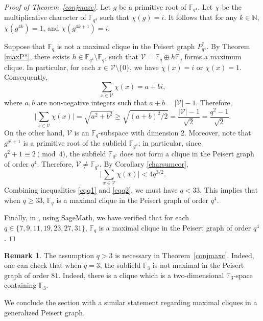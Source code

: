 \documentclass[12pt,reqno]{amsart}
\theoremstyle{definition}
\newtheorem{rem}[thm]{Remark}
\newcommand{\N}{\mathbb{N}}
\newcommand{\F}{\mathbb{F}}
\begin{document}
\begin{proof}[Proof of Theorem~\ref{conjmaxc}]
Let $g$ be a primitive root of $\F_{q^4}$. Let $\chi$ be the multiplicative character of $\F_{q^4}$ such that $\chi(g)=i$. It follows that for any $k \in \N$, $\chi(g^{4k})=1$, and $\chi(g^{4k+1})=i$. 

Suppose that $\F_{q}$ is not a maximal clique in the Peisert graph $P^*_{q^4}$. By Theorem \ref{maxP*}, there exists $h \in \F_{q^4} \setminus \F_{q}$, such that $\mathcal{V}=\F_{q} \oplus h\F_{q}$ forms a maximum clique. In particular, for each $x \in \mathcal{V}\setminus \{0\}$, we have $\chi(x)=i$ or $\chi(x)=1$.
Consequently,
\[
\sum_{x \in \mathcal{V}} \chi(x)=a+bi,
\]
where $a,b$ are non-negative integers such that $a+b=|\mathcal{V}|-1$. Therefore,
\begin{equation}\label{eqq1}
\bigg|\sum_{x \in \mathcal{V}} \chi(x)\bigg|=\sqrt{a^2+b^2} \geq \sqrt{(a+b)^2/2}=\frac{|\mathcal{V}|-1}{\sqrt{2}}=\frac{q^2-1}{\sqrt{2}}.    
\end{equation}
On the other hand, $\mathcal{V}$ is an  $\F_{q}$-subspace with dimension $2$. Moreover, note that $g^{q^2+1}$ is a primitive root of the subfield $\F_{q^2}$; in particular, since $q^2+1 \equiv 2 \pmod 4$, the subfield $\F_{q^2}$ does not form a clique in the Peisert graph of order $q^4$. Therefore, $\mathcal{V} \neq \F_{q^2}$. By Corollary \ref{charsumcor},
\begin{equation}\label{eqq2}
\bigg|\sum_{x \in \mathcal{V}} \chi(x)\bigg| < 4q^{3/2}.
\end{equation}
Combining inequalities \eqref{eqq1} and \eqref{eqq2}, we must have $q<33$. This implies that when $q \geq 33$, $\F_{q}$ is a maximal clique in the Peisert graph of order $q^4$. 

Finally, in \cite{Yip3}, using SageMath, we have verified that for each $q \in \{7,9,11,19,23,27,31\}$, $\F_{q}$ is a maximal clique in the Peisert graph of order $q^4$. 
\end{proof}

\begin{rem}
The assumption $q>3$ is necessary in Theorem~\ref{conjmaxc}. Indeed, one can check that when $q=3$, the subfield $\F_3$ is not maximal in the Peisert graph of order $81$. Indeed, there is a clique which is a two-dimensional $\F_3$-space containing $\F_3$. 
\end{rem}

We conclude the section with a similar statement regarding maximal cliques in a generalized Peisert graph.
\end{document}
